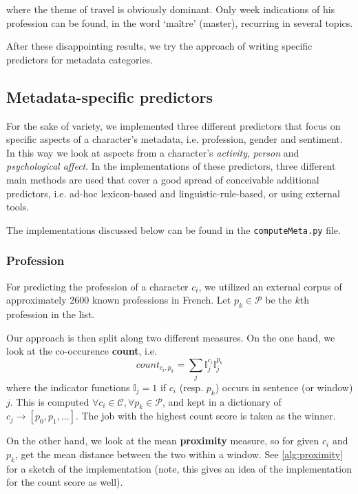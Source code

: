 where the theme of travel is obviously dominant. Only week indications of his profession can be found, in the word `ma\^itre' (master), recurring in several topics. 

After these disappointing results, we try the approach of writing specific predictors for metadata categories.

\subsection{Metadata-specific predictors}
For the sake of variety, we implemented three different predictors that focus on specific aspects of a character's metadata, i.e. profession, gender and sentiment. In this way we look at aspects from a character's \textit{activity}, \textit{person} and \textit{psychological affect}. In the implementations of these predictors, three different main methods are used that cover a good spread of conceivable additional predictors, i.e. ad-hoc lexicon-based and linguistic-rule-based, or using external tools.

The implementations discussed below can be found in the \texttt{computeMeta.py} file.


\subsubsection{Profession} \label{sssec:profession}
For predicting the profession of a character $c_i$, we utilized an external corpus  of approximately 2600 known professions in French. Let $p_k \in \mathcal{P}$ be the $k$th  profession in the list. 

Our approach is then split along two different measures. On the one hand, we look at the co-occurence \textbf{count}, i.e. 
\begin{equation}
count_{c_i, p_k} = \sum_j \mathbb{I}^{c_i}_j \mathbb{I}^{p_k}_j
\end{equation}
where the indicator functions $\mathbb{I}_j = 1$ if $c_i$ (resp. $p_k$) occurs in sentence (or window) $j$. This is computed $\forall c_i \in \mathcal{C}, \forall p_k \in \mathcal{P}$, and kept in a dictionary of $c_j \rightarrow [p_0, p_1, ...]$. The job with the highest count score is taken as the winner. 

On the other hand, we look at the mean \textbf{proximity} measure, so for given $c_i$ and $p_k$, get the mean distance between the two within a window. See \cref{alg:proximity} for a sketch of the implementation (note, this gives an idea of the implementation for the count score as well).

